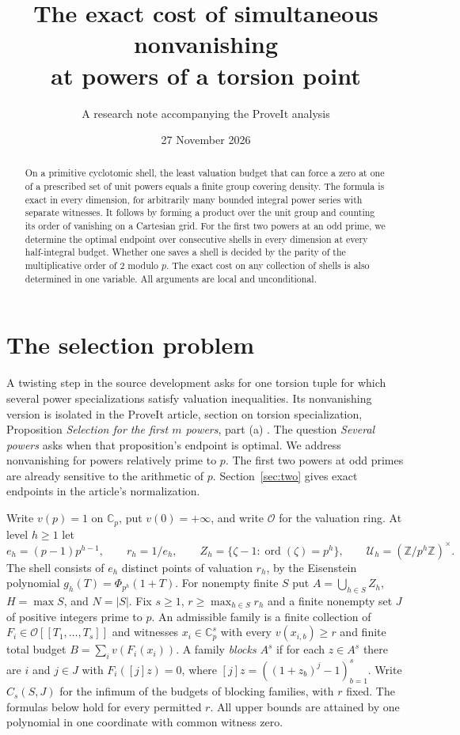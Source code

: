 \documentclass[11pt]{article}
\title{The exact cost of simultaneous nonvanishing\\at powers of a torsion point}
\author{A research note accompanying the ProveIt analysis}
\date{27 November 2026}
\theoremstyle{definition}\newtheorem{example}[theorem]{Example}
\newcommand{\OO}{\mathcal O}
\newcommand{\Cp}{\mathbb C_p}
\newcommand{\U}{\mathcal U}
\newcommand{\ord}{\operatorname{ord}}
\begin{document}
\maketitle
\begin{abstract}
On a primitive cyclotomic shell, the least valuation budget that can force a
zero at one of a prescribed set of unit powers equals a finite group covering
density. The formula is exact in every dimension, for arbitrarily many bounded
integral power series with separate witnesses. It follows by forming a product
over the unit group and counting its order of vanishing on a Cartesian grid.
For the first two powers at an odd prime, we determine the optimal endpoint
over consecutive shells in every dimension at every half-integral budget.
Whether one saves a shell is decided by the parity of the multiplicative
order of $2$ modulo $p$. The exact cost on any collection of shells is also
determined in one variable. All arguments are local and unconditional.
\end{abstract}

\section{The selection problem}
A twisting step in the source development asks for one torsion tuple for which
several power specializations satisfy valuation inequalities. Its nonvanishing
version is isolated in the ProveIt article, section on torsion specialization,
Proposition \emph{Selection for the first $m$ powers}, part (a) \cite{proveit}.
The question \emph{Several powers} asks when that proposition's endpoint is
optimal. We address nonvanishing for powers relatively prime to $p$.
The first two powers at odd primes are already sensitive to the arithmetic
of $p$. Section~\ref{sec:two} gives exact endpoints in the article's
normalization.

Write $v(p)=1$ on $\Cp$, put $v(0)=+\infty$, and write $\OO$ for the valuation
ring. At level $h\ge1$ let
\[
 e_h=(p-1)p^{h-1},\qquad r_h=1/e_h,\qquad
 Z_h=\{\zeta-1:\ord(\zeta)=p^h\},\qquad
 \U_h=(\mathbb Z/p^h\mathbb Z)^\times .
\]
The shell consists of $e_h$ distinct points of valuation $r_h$, by the
Eisenstein polynomial $g_h(T)=\Phi_{p^h}(1+T)$. For nonempty finite $S$ put
$A=\bigcup_{h\in S}Z_h$, $H=\max S$, and $N=|S|$. Fix $s\ge1$, $r\ge\max_{h\in S}r_h$
and a finite nonempty set $J$ of positive integers prime to $p$.
An admissible family is a finite collection of $F_i\in\OO[[T_1,\ldots,T_s]]$ and witnesses
$x_i\in\Cp^s$ with every $v(x_{i,b})\ge r$ and finite total budget
$B=\sum_i v(F_i(x_i))$. A family \emph{blocks} $A^s$ if for each $z\in A^s$
there are $i$ and $j\in J$ with $F_i([j]z)=0$, where
$[j]z=((1+z_b)^j-1)_{b=1}^s$. Write $C_s(S,J)$ for the infimum of the
budgets of blocking families, with $r$ fixed. The formulas below hold for
every permitted $r$. All upper bounds are attained by one polynomial in
one coordinate with common witness zero.
\end{document}
